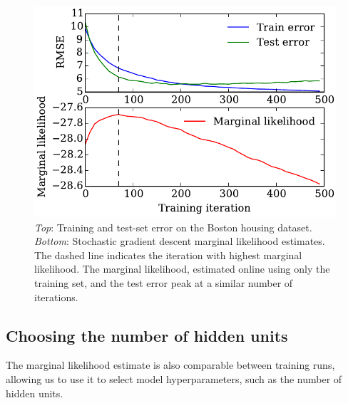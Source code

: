 \documentclass[]{article}
\begin{document}
\begin{figure}[h!]
\begin{center}
\includegraphics[width=\columnwidth]{../experiments/2015_03_01_housing/2/marglik}
\vskip -0.1in
\caption{\emph{Top}: Training and test-set error on the Boston housing dataset.
\emph{Bottom}: Stochastic gradient descent marginal likelihood estimates.
The dashed line indicates the iteration with highest marginal likelihood.
The marginal likelihood, estimated online using only the training set, and the
test error peak at a similar number of iterations.}
\label{fig:housing}
\end{center}
\end{figure}



\subsection{Choosing the number of hidden units}


The marginal likelihood estimate is also comparable between training runs, allowing us to use it to select model hyperparameters, such as the number of hidden units.
\end{document}
